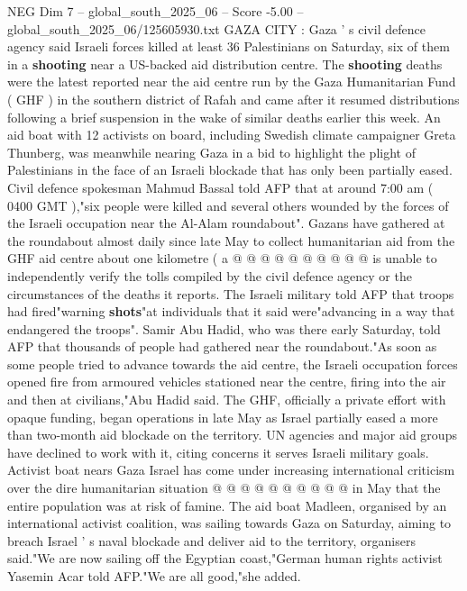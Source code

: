 \begin{textsample}{NEG Dim 7 – global\_south\_2025\_06 – Score -5.00 – global\_south\_2025\_06/125605930.txt}  \label{ex:f7_neg_275}
GAZA CITY : Gaza ' s civil defence agency said Israeli forces killed at least 36 Palestinians on Saturday, six of them in a \textbf{shooting} near a US-backed aid distribution centre.
The \textbf{shooting} deaths were the latest reported near the aid centre run by the Gaza Humanitarian Fund ( GHF ) in the southern district of Rafah and came after it resumed distributions following a brief suspension in the wake of similar deaths earlier this week.
An aid boat with 12 activists on board, including Swedish climate campaigner Greta Thunberg, was meanwhile nearing Gaza in a bid to highlight the plight of Palestinians in the face of an Israeli blockade that has only been partially eased.
Civil defence spokesman Mahmud Bassal told AFP that at around 7:00 am ( 0400 GMT ),"six people were killed and several others wounded by the forces of the Israeli occupation near the Al-Alam roundabout".
Gazans have gathered at the roundabout almost daily since late May to collect humanitarian aid from the GHF aid centre about one kilometre ( a @ @ @ @ @ @ @ @ @ @ is unable to independently verify the tolls compiled by the civil defence agency or the circumstances of the deaths it reports.
The Israeli military told AFP that troops had fired"warning \textbf{shots}"at individuals that it said were"advancing in a way that endangered the troops".
Samir Abu Hadid, who was there early Saturday, told AFP that thousands of people had gathered near the roundabout."As soon as some people tried to advance towards the aid centre, the Israeli occupation forces opened fire from armoured vehicles stationed near the centre, firing into the air and then at civilians,"Abu Hadid said.
The GHF, officially a private effort with opaque funding, began operations in late May as Israel partially eased a more than two-month aid blockade on the territory.
UN agencies and major aid groups have declined to work with it, citing concerns it serves Israeli military goals.
Activist boat nears Gaza Israel has come under increasing international criticism over the dire humanitarian situation @ @ @ @ @ @ @ @ @ @ in May that the entire population was at risk of famine.
The aid boat Madleen, organised by an international activist coalition, was sailing towards Gaza on Saturday, aiming to breach Israel ' s naval blockade and deliver aid to the territory, organisers said."We are now sailing off the Egyptian coast,"German human rights activist Yasemin Acar told AFP."We are all good,"she added.

\end{textsample}
